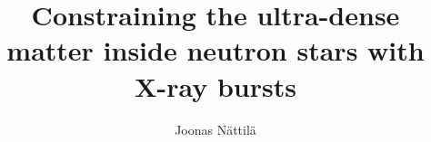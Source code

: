 \begin{titlepage} 

    \title{\titlefont Constraining the ultra-dense matter inside neutron stars with X-ray bursts}
    
    \author{Joonas Nättilä}
    \date{}
    \maketitle


\end{titlepage}
